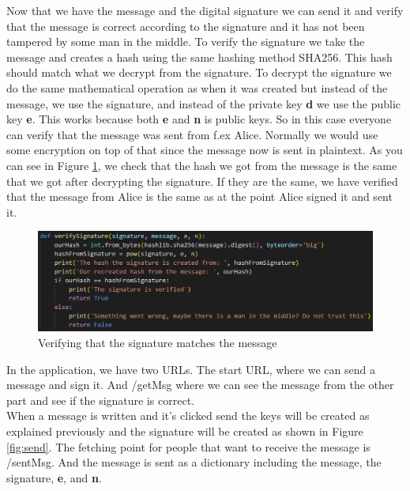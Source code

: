 \documentclass[12pt, letterpaper]{article}
\begin{document}
Now that we have the message and the digital signature we can send it and verify that the message is correct according to the signature and it has not been tampered by some man in the middle. To verify the signature we take the message and creates a hash using the same hashing method SHA256. This hash should match what we decrypt from the signature. To decrypt the signature we do the same mathematical operation as when it was created but instead of the message, we use the signature, and instead of the private key \textbf{d} we use the public key \textbf{e}. This works because both \textbf{e} and \textbf{n} is public keys. So in this case everyone can verify that the message was sent from f.ex Alice. Normally we would use some encryption on top of that since the message now is sent in plaintext. As you can see in Figure \ref{fig:verify}, we check that the hash we got from the message is the same that we got after decrypting the signature. If they are the same, we have verified that the message from Alice is the same as at the point Alice signed it and sent it.

\begin{figure}[H]
  \includegraphics[width=\linewidth]{code_snippets/verify.PNG}\centering
  \caption{Verifying that the signature matches the message}
  \label{fig:verify}
\end{figure}

In the application, we have two URLs. The start URL, where we can send a message and sign it. And /getMsg where we can see the message from the other part and see if the signature is correct. \\

When a message is written and it's clicked send the keys will be created as explained previously and the signature will be created as shown in Figure \ref{fig:send}. The fetching point for people that want to receive the message is /sentMsg. And the message is sent as a dictionary including the message, the signature, \textbf{e}, and \textbf{n}.
\end{document}

